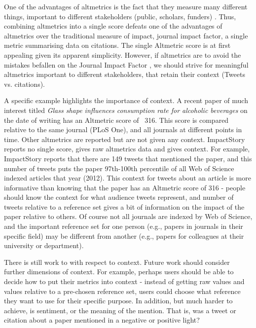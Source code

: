 \documentclass[letterpaper,superscriptaddress,showkeys,longbibliography]{revtex4-1}\usepackage{graphicx, color}
\begin{document}
One of the advantages of altmetrics is the fact that they measure many different things, important to different stakeholders (public, scholars, funders) \cite{x,y}. Thus, combining altmetrics into a single score defeats one of the advantages of altmetrics over the traditional measure of impact, journal impact factor, a single metric summarising data on citations. The single Altmetric score is at first appealing given its apparent simplicity. However, if altmetrics are to avoid the mistakes befallen on the Journal Impact Factor \cite{ploseditorial}, we should strive for meaningful altmetrics important to different stakeholders, that retain their context (Tweets vs. citations). 

A specific example highlights the importance of context. A recent paper of much interest titled \emph{Glass shape influences consumption rate for alcoholic beverages} \cite{attwood2012} on the date of writing has an Altmetric score of ~316. This score is compared relative to the same journal (PLoS One), and all journals at different points in time. Other altmetrics are reported but are not given any context. ImpactStory reports no single score, gives raw altmetrics data and gives context. For example, ImpactStory reports that there are 149 tweets that mentioned the paper, and this number of tweets puts the paper 97th-100th percentile of all Web of Science indexed articles that year (2012). This context for tweets about an article is more informative than knowing that the paper has an Altmetric score of 316 - people should know the context for what audience tweets represent, and number of tweets relative to a reference set gives a bit of information on the impact of the paper relative to others. Of course not all journals are indexed by Web of Science, and the important reference set for one person (e.g., papers in journals in their specific field) may be different from another (e.g., papers for colleagues at their university or department). 

There is still work to with respect to context. Future work should consider further dimensions of context. For example, perhaps users should be able to decide how to put their metrics into context - instead of getting raw values and values relative to a pre-chosen reference set, users could choose what reference they want to use for their specific purpose. In addition, but much harder to achieve, is sentiment, or the meaning of the mention. That is, was a tweet or citation about a paper mentioned in a negative or positive light?
\end{document}
